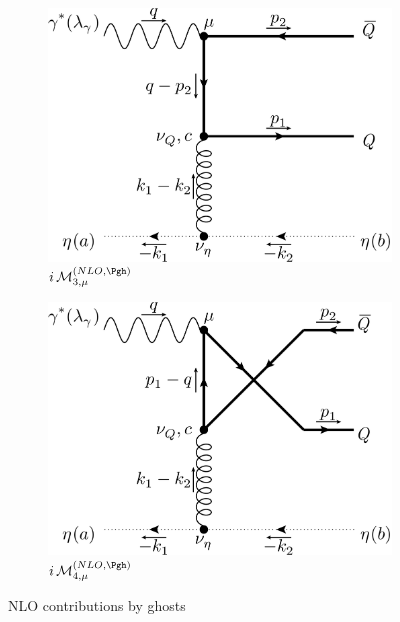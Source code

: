 \begin{figure}[ht!]
	\begin{subfigure}[t]{.42\textwidth}
		\includegraphics[width=\textwidth]{pyfeyn/nlo-gh-3}
		\caption{$i\Md^{(NLO,\Pgh)}_{3,\mu}$}
	\end{subfigure}\hspace{.1\textwidth}%
	\begin{subfigure}[t]{.42\textwidth}
		\includegraphics[width=\textwidth]{pyfeyn/nlo-gh-4}
		\caption{$i\Md^{(NLO,\Pgh)}_{4,\mu}$}
	\end{subfigure}
	\caption{NLO contributions by ghosts}\label{fig:FeynNLOgh}
\end{figure}

